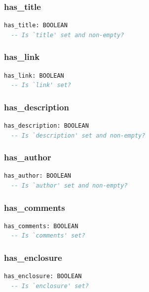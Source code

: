 \subsubsection{has\_title}

\begin{lstlisting}[language=Eiffel]
has_title: BOOLEAN
  -- Is `title' set and non-empty?
\end{lstlisting}

\subsubsection{has\_link}

\begin{lstlisting}[language=Eiffel]
has_link: BOOLEAN
  -- Is `link' set?
\end{lstlisting}

\subsubsection{has\_description}

\begin{lstlisting}[language=Eiffel]
has_description: BOOLEAN
  -- Is `description' set and non-empty?
\end{lstlisting}

\subsubsection{has\_author}

\begin{lstlisting}[language=Eiffel]
has_author: BOOLEAN
  -- Is `author' set and non-empty?
\end{lstlisting}

\subsubsection{has\_comments}

\begin{lstlisting}[language=Eiffel]
has_comments: BOOLEAN
  -- Is `comments' set?
\end{lstlisting}

\subsubsection{has\_enclosure}

\begin{lstlisting}[language=Eiffel]
has_enclosure: BOOLEAN
  -- Is `enclosure' set?
\end{lstlisting}


